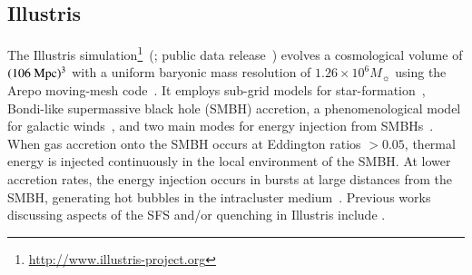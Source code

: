 \documentclass[tighten, preprint]{aastex62}
\begin{document}

\subsection{Illustris}
The Illustris 
simulation\footnote{\url{http://www.illustris-project.org}}~(\citealt{vogelsberger2014,genel2014}; public data release~\citealt{nelson2015a}) 
evolves a cosmological volume of $(106\ \rm{Mpc})^3$ with a uniform 
baryonic mass resolution of $1.26\times10^6M_{\sun}$ using the {\sc Arepo} 
moving-mesh code~\citep{springel2010}. 
It employs sub-grid models for star-formation~\citep{springel2003},
Bondi-like supermassive black hole (SMBH) accretion, a phenomenological 
model for galactic winds~\citep{oppenheimer2006}, and two main modes for energy injection 
from SMBHs~\citep[see][]{vogelsberger2013}. When gas accretion onto the 
SMBH occurs at Eddington ratios $>0.05$, thermal energy is injected 
continuously in  the local environment of the SMBH. At lower accretion 
rates, the  energy injection occurs in bursts at large distances from the 
SMBH, generating hot bubbles in the intracluster medium~\citep{sijacki2007}.
Previous works discussing aspects of the SFS and/or quenching in Illustris 
include \citet{genel2014, vogelsberger2014, sparre2015, bluck2016, terrazas2017}. 
\end{document}

